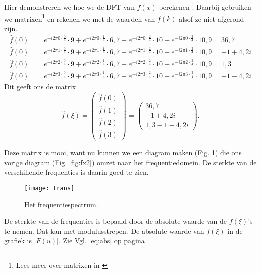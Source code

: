 \documentclass[11pt,fleqn]{book} %
\begin{document}
Hier demonstreren we hoe we de DFT van $f(x)$ berekenen \cite{sr}. Daarbij gebruiken we matrixen\footnote{Lees meer over matrixen in \cite{mat}} en rekenen we met de waarden van $f(k)$ alsof ze niet afgerond zijn.
\begin{displaymath}
\begin{aligned}
\hat{f}(0)&=e^{-i2\pi 0\cdot\frac{0}{4}}\cdot 9+e^{-i2\pi 0\cdot\frac{1}{4}}\cdot 6,7+e^{-i2\pi 0\cdot\frac{2}{4}}\cdot 10+e^{-i2\pi 0\cdot\frac{3}{4}}\cdot 10,9=36,7\\
\hat{f}(0)& =e^{-i2\pi 1\cdot\frac{0}{4}}\cdot 9+e^{-i2\pi 1\cdot\frac{1}{4}}\cdot 6,7+e^{-i2\pi 1\cdot\frac{2}{4}}\cdot 10+e^{-i2\pi 1\cdot\frac{3}{4}}\cdot 10,9=-1+4,2i\\
\hat{f}(0)& =e^{-i2\pi 2\cdot\frac{0}{4}}\cdot 9+e^{-i2\pi 2\cdot\frac{1}{4}}\cdot 6,7+e^{-i2\pi 2\cdot\frac{2}{4}}\cdot 10+e^{-i2\pi 2\cdot\frac{3}{4}}\cdot 10,9=1,3\\
\hat{f}(0)& =e^{-i2\pi 3\cdot\frac{0}{4}}\cdot 9+e^{-i2\pi 3\cdot\frac{1}{4}}\cdot 6,7+e^{-i2\pi 3\cdot\frac{2}{4}}\cdot 10+e^{-i2\pi 3\cdot\frac{3}{4}}\cdot 10,9=-1-4,2i
\end{aligned}
\end{displaymath}
Dit geeft ons de matrix
\begin{displaymath}
\hat{f}(\xi)=\begin{pmatrix}\hat{f}(0)\\\hat{f}(1)\\\hat{f}(2)\\\hat{f}(3)\end{pmatrix}=\begin{pmatrix}36,7\\-1+4,2i\\1,3-1-4,2i\end{pmatrix}.
\end{displaymath}

Deze matrix is mooi, want nu kunnen we een diagram maken (Fig. \ref{fig:trans}) die ons vorige diagram (Fig. \ref{fig:fx2}) omzet naar het frequentiedomein. De sterkte van de verschillende frequenties is daarin goed te zien.

\begin{figure}[h]
	\centering\texttt{[image: trans]}
	\caption{Het frequentiespectrum.}
	\label{fig:trans}
\end{figure}

De sterkte van de frequenties is bepaald door de absolute waarde van de $f(\xi)$'s te nemen. Dat kan met modulusstrepen. De absolute waarde van $f(\xi)$ in de grafiek is $\left|F(u)\right|$. Zie Vgl. \ref{eq:abs} op pagina \pageref{eq:abs}.
\end{document}
